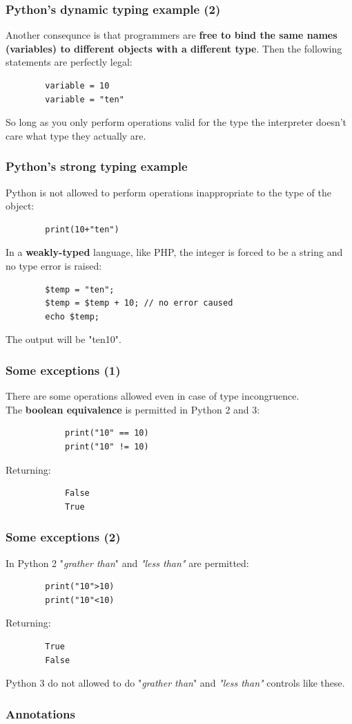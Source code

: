 \documentclass[xcolor ={table,usenames,dvipsnames}]{beamer}
\theoremstyle{definition}
\begin{document}
	\begin{frame}[fragile]
		\frametitle{Python's dynamic typing example (2)}
		Another consequnce is that programmers are \textbf{free to bind the same names (variables) to different objects with a different type}. Then the following statements are perfectly legal:
		
		\begin{lstlisting}
		variable = 10
		variable = "ten"
		\end{lstlisting}
		
		So long as you only perform operations valid for the type the interpreter doesn't care what type they actually are. 
	\end{frame}

	\begin{frame}[fragile]
		\frametitle{Python's strong typing example}
		Python is not allowed to perform operations inappropriate to the type of the object: 
		\begin{lstlisting}
		print(10+"ten")
		\end{lstlisting}
		
		In a \textbf{weakly-typed} language, like PHP, the integer is forced to be a string and no type error is raised:
		\begin{lstlisting}
		$temp = "ten"; 
		$temp = $temp + 10; // no error caused
		echo $temp;
		\end{lstlisting}
	The output will be "ten10".
	\end{frame}

	\begin{frame}[fragile]
		\frametitle{Some exceptions (1)}
		There are some operations allowed even in case of type incongruence.\\
		The\textbf{ boolean equivalence} is permitted in Python 2 and 3: 
		
		\begin{lstlisting}
			print("10" == 10)
			print("10" != 10)
		\end{lstlisting}
		Returning:
		\begin{lstlisting}
			False
			True
		\end{lstlisting}
	\end{frame}

	\begin{frame}[fragile]
		\frametitle{Some exceptions (2)}
		In Python 2 "\textit{grather than}" and \textit{"less than"} are permitted:
		
		\begin{lstlisting}
		print("10">10)
		print("10"<10)
		\end{lstlisting}
		
		Returning:
		
		\begin{lstlisting}
		True
		False
		\end{lstlisting}
		
		Python 3 do not allowed to do "\textit{grather than}" and \textit{"less than"} controls like these.\\	
	\end{frame}

	\begin{frame}
		\frametitle{Annotations}
	\end{frame}
		
	
	

	
	
	
	
	
	
	
	
	
	
	
\end{document}
